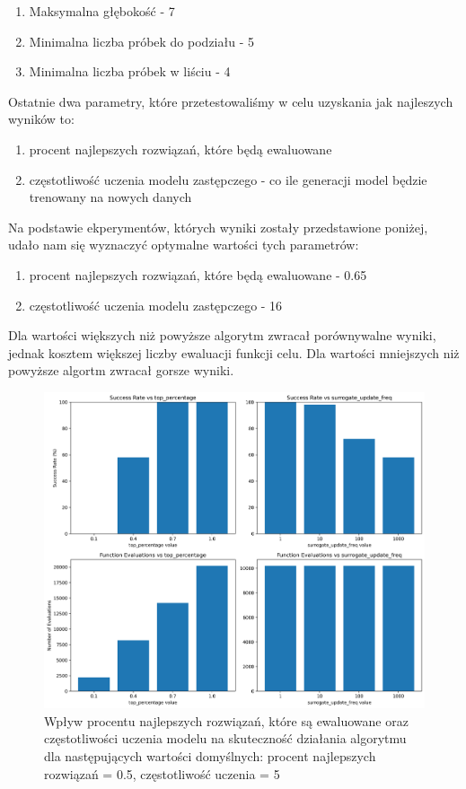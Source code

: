 \documentclass{article}
\begin{document}
\begin{enumerate}
    \item Maksymalna głębokość - 7
    \item Minimalna liczba próbek do podziału - 5
    \item Minimalna liczba próbek w liściu - 4
\end{enumerate}

Ostatnie dwa parametry, które przetestowaliśmy w celu uzyskania jak najleszych wyników to:
\begin{enumerate}
    \item procent najlepszych rozwiązań, które będą ewaluowane
    \item częstotliwość uczenia modelu zastępczego - co ile generacji model będzie trenowany na nowych danych
\end{enumerate}

Na podstawie ekperymentów, których wyniki zostały przedstawione poniżej, udało nam się wyznaczyć optymalne wartości tych parametrów:
\begin{enumerate}
    \item procent najlepszych rozwiązań, które będą ewaluowane - 0.65
    \item częstotliwość uczenia modelu zastępczego - 16
\end{enumerate}

Dla wartości większych niż powyższe algorytm zwracał porównywalne wyniki, jednak kosztem większej liczby ewaluacji funkcji celu. Dla wartości mniejszych niż powyższe algortm zwracał gorsze wyniki.

\begin{figure}[H]
    \centering
    \includegraphics[width=\textwidth]{surrogate_de_parameter_tuning_results1.png}
    \caption{Wpływ procentu najlepszych rozwiązań, które są ewaluowane oraz częstotliwości uczenia modelu na skuteczność działania algorytmu dla następujących wartości domyślnych: procent najlepszych rozwiązań = 0.5, częstotliwość uczenia = 5}
    \label{fig:surogate_de_parameter_results1}
\end{figure}
\end{document}
